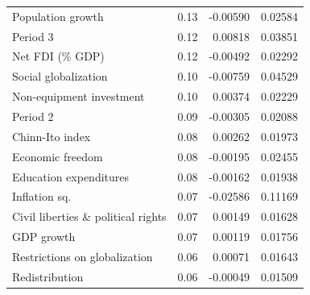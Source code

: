 \documentclass[preprint, nonatbib, 10pt]{elsarticle}
\begin{document}
\begin{table}[ht!]
\begin{tabular}{lrrr}
      Population growth & 0.13 & -0.00590 & 0.02584 \\
      Period 3 & 0.12 & 0.00818 & 0.03851 \\ 
      Net FDI (\% GDP) & 0.12 & -0.00492 & 0.02292 \\
      Social globalization & 0.10 & -0.00759 & 0.04529 \\ 
      Non-equipment investment & 0.10 & 0.00374 & 0.02229 \\ 
      Period 2 & 0.09 & -0.00305 & 0.02088 \\
      Chinn-Ito index & 0.08 & 0.00262 & 0.01973 \\
      Economic freedom & 0.08 & -0.00195 & 0.02455 \\ 
      Education expenditures & 0.08 & -0.00162 & 0.01938 \\
      Inflation sq. & 0.07 & -0.02586 & 0.11169 \\
      Civil liberties \& political rights & 0.07 & 0.00149 & 0.01628 \\
      GDP growth & 0.07 & 0.00119 & 0.01756 \\
      Restrictions on globalization & 0.06 & 0.00071 & 0.01643 \\ 
      Redistribution & 0.06 & -0.00049 & 0.01509 \\
      \bottomrule
    \end{tabular}
    \end{table}
\end{document}
